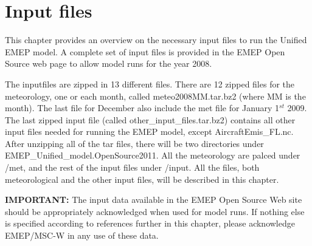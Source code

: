 \chapter{Input files}
\label{ch:InputFiles}

This chapter provides an overview on the necessary input files to run 
the Unified EMEP model. A complete set of input files is provided in
the EMEP Open Source web page to allow model runs for the year 2008. 

The inputfiles are zipped in 13 different files. 
There are 12 zipped files for the meteorology, one or each month, called meteo2008MM.tar.bz2 (where MM 
is the month). 
The last file for December also include the met file for January 1$^{st}$ 2009. 
The last zipped input file (called other\_input\_files.tar.bz2) contains all other input 
files needed for running the EMEP model, except AircraftEmis\_FL.nc.
After unzipping all of the tar files, there will be two directories under EMEP\_Unified\_model.OpenSource2011. 
All the meteorology are palced under /met, and the rest of the input files under /input. 
All the files, both meteorological and 
the other input files, will be described in this chapter.

{\bf IMPORTANT:} The input data available in the EMEP Open Source Web
site should be appropriately acknowledged when used for model runs.
If nothing else is specified according to references further in this
chapter, please acknowledge EMEP/MSC-W in
any use of these data.





